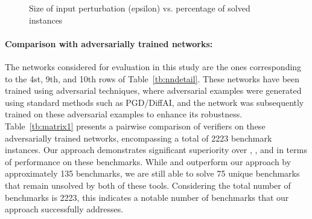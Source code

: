\begin{figure}[]    \centering
\scalebox{0.8}{
  
  }
    \caption{Size of input perturbation (epsilon) vs. percentage of solved instances}
    \label{res:ep:milp_with_milp}
\end{figure}


\paragraph{Comparison with adversarially trained networks: }
The networks considered for evaluation in this study are the ones corresponding to the 4st, 9th, and 10th 
rows of Table~\ref{tb:nndetail}. These networks have been trained using adversarial techniques, 
where adversarial examples were generated using standard methods such as PGD/DiffAI, and the network was subsequently 
trained on these adversarial examples to enhance its robustness. Table~\ref{tb:matrix1} presents a 
pairwise comparison of verifiers on these adversarially trained networks, 
encompassing a total of 2223 benchmark instances. 
Our approach demonstrates significant superiority over \deeppoly{}, \kpoly{}, and \deepsrgr{} in terms of 
performance on these benchmarks. While \alphabeta{} and \ovaltool{} outperform our approach by approximately 
135 benchmarks, we are still able to solve 75 unique benchmarks that remain unsolved by both of these tools. 
Considering the total number of benchmarks is 2223, this indicates a notable number of benchmarks that our 
approach successfully addresses.


